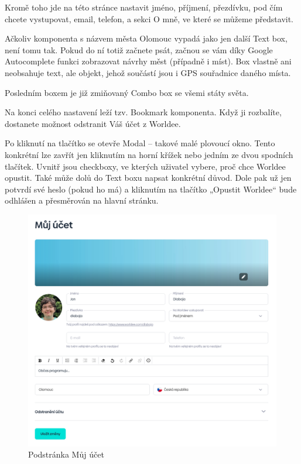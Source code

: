 Kromě toho jde na této stránce nastavit jméno, příjmení, přezdívku, pod čím chcete vystupovat, email, telefon, a sekci O mně, ve které se můžeme představit.

Ačkoliv komponenta s názvem města Olomouc vypadá jako jen další Text box, není tomu tak. Pokud do ní totiž začnete psát, začnou se vám díky Google Autocomplete funkci zobrazovat návrhy měst (případně i míst). Box vlastně ani neobsahuje text, ale objekt, jehož součástí jsou i GPS souřadnice daného místa.

Posledním boxem je již zmiňovaný Combo box se všemi státy světa.

Na konci celého nastavení leží tzv. Bookmark komponenta. Když ji rozbalíte, dostanete možnost odstranit Váš účet z Worldee.

Po kliknutí na tlačítko se otevře Modal – takové malé plovoucí okno. Tento konkrétní lze zavřít jen kliknutím na horní křížek nebo jedním ze dvou spodních tlačítek. Uvnitř jsou checkboxy, ve kterých uživatel vybere, proč chce Worldee opustit. Také může dolů do Text boxu napsat konkrétní důvod. Dole pak už jen potvrdí své heslo (pokud ho má) a kliknutím na tlačítko „Opustit Worldee“ bude odhlášen a přesměrován na hlavní stránku.

\begin{figure}
    \centering
    \includegraphics[width=1\linewidth]{obrazky/account.png}
    \caption{Podstránka Můj účet}
\end{figure}

